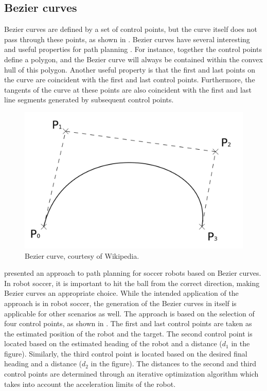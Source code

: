 \subsection{Bezier curves}

Bezier curves are defined by a set of control points, but the curve itself does not pass through these points, as shown in . Bezier curves have several interesting and useful properties for path planning \citep{choi2008path}. For instance, together the control points define a polygon, and the Bezier curve will always be contained within the convex hull of this polygon. Another useful property is that the first and last points on the curve are coincident with the first and last control points. Furthermore, the tangents of the curve at these points are also coincident with the first and last line segments generated by subsequent control points. 

\begin{figure}[h!]
	\centering
	\includegraphics[width=0.5\linewidth]{fig/lit_rev/bezier_curve}
	\caption[Bezier curve.]{Bezier curve, courtesy of Wikipedia.}
	\label{fig:bezier_curve}
\end{figure}

\citet{jolly2009bezier} presented an approach to path planning for soccer robots based on Bezier curves. In robot soccer, it is important to hit the ball from the correct direction, making Bezier curves an appropriate choice. While the intended application of the approach is in robot soccer, the generation of the Bezier curves in itself is applicable for other scenarios as well. The approach is based on the selection of four control points, as shown in . The first and last control points are taken as the estimated position of the robot and the target. The second control point is located based on the estimated heading of the robot and a distance ($d_1$ in the figure). Similarly, the third control point is located based on the desired final heading and a distance ($d_2$ in the figure). The distances to the second and third control points are determined through an iterative optimization algorithm which takes into account the acceleration limits of the robot.


